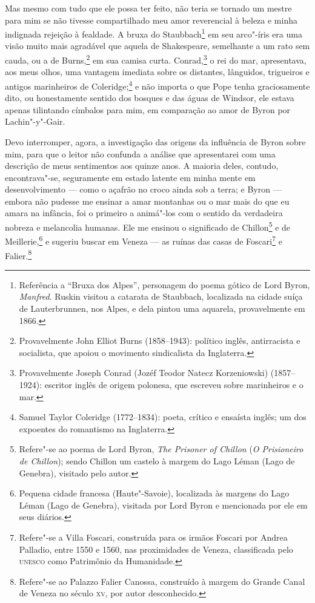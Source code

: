 Mas mesmo com tudo que ele possa ter feito, não teria se tornado um
mestre para mim se não tivesse compartilhado meu amor reverencial à
beleza e minha indignada rejeição à fealdade. A bruxa do
Staubbach\footnote{Referência a ``Bruxa dos Alpes'', personagem do poema
  gótico de Lord Byron, \textit{Manfred}. Ruskin visitou a catarata de
  Staubbach, localizada na cidade suíça de Lauterbrunnen, nos Alpes, e
  dela pintou uma aquarela, provavelmente em 1866.} em
seu arco"-íris era uma visão muito mais agradável que aquela de
Shakespeare, semelhante a um rato sem cauda, ou a de Burns,\footnote{Provavelmente
  John Elliot Burns (1858--1943): político inglês, antirracista e
  socialista, que apoiou o movimento sindicalista da Inglaterra.} em sua camisa curta. Conrad,\footnote{Provavelmente Joseph
  Conrad (Jozéf Teodor Natecz Korzeniowski) (1857--1924): escritor inglês
  de origem polonesa, que escreveu sobre marinheiros e o mar.} o rei do mar, apresentava, aos meus olhos, uma vantagem
imediata sobre os distantes, lânguidos, trigueiros e antigos marinheiros
de Coleridge;\footnote{Samuel Taylor Coleridge (1772--1834): poeta,
  crítico e ensaísta inglês; um dos expoentes do romantismo na
  Inglaterra.} e não importa o que Pope tenha
graciosamente dito, ou honestamente sentido dos bosques e das águas de
Windsor, ele estava apenas tilintando címbalos para mim, em comparação
ao amor de Byron por Lachin"-y"-Gair.

Devo interromper, agora, a investigação das origens da influência
de Byron sobre mim, para que o leitor não confunda a análise que
apresentarei com uma descrição de meus sentimentos aos quinze anos. A
maioria deles, contudo, encontrava"-se, seguramente em estado latente em
minha mente em desenvolvimento --- como o açafrão no croco ainda sob a
terra; e Byron --- embora não pudesse me ensinar a amar montanhas ou o
mar mais do que eu amara na infância, foi o primeiro a animá"-los com o
sentido da verdadeira nobreza e melancolia humanas. Ele me ensinou o \label{chillon}
significado de Chillon\footnote{Refere"-se ao poema de Lord Byron, 
  \textit{The Prisoner of Chillon} (\textit{O Prisioneiro de
  Chillon}); sendo Chillon um castelo à margem do Lago Léman (Lago de
  Genebra), visitado pelo autor.} e de
Meillerie,\footnote{Pequena cidade francesa (Haute"-Savoie), localizada às
  margens do Lago Léman (Lago de Genebra), visitada por Lord Byron e
  mencionada por ele em seus diários.} e sugeriu buscar
em Veneza --- as ruínas das casas de Foscari\footnote{Refere"-se a Villa
  Foscari, construída para os irmãos Foscari por Andrea Palladio, entre
  1550 e 1560, nas proximidades de Veneza, classificada pelo \textsc{unesco} como
  Patrimônio da Humanidade.} e Falier.\footnote{Refere"-se
  ao Palazzo Falier Canossa, construído à margem do Grande Canal de
  Veneza no século \textsc{xv}, por autor desconhecido.}

